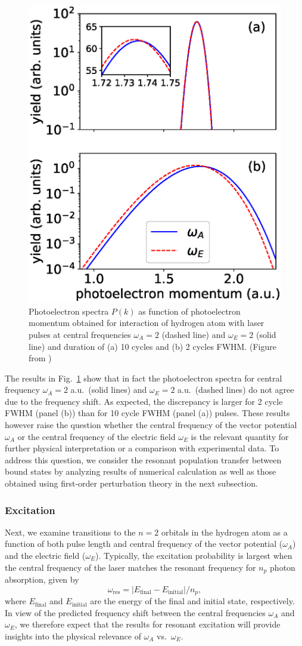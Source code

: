 \begin{figure}[!ht]
\centering
    \includegraphics[width=0.4\linewidth]{figs/Frequency_shift/single_photon_ion.eps}
\caption{
Photoelectron spectra $P(k)$ as function of photoelectron momentum obtained for interaction of hydrogen atom with laser pulses at central frequencies $\omega_A=2$ (dashed line) and $\omega_E=2$ (solid line) and duration of (a) 10 cycles and (b) 2 cycles FWHM. (Figure from \cite{venzke2018_Central})
}
  \label{fig:ionizationA}
\end{figure}

The results in Fig.~\ref{fig:ionizationA} show that in fact the photoelectron spectra for central frequency $\omega_A = 2$ a.u.\  (solid lines) and $\omega_E = 2$ a.u.\  (dashed lines) do not agree due to the frequency shift. As expected, the discrepancy is larger for 2 cycle FWHM (panel (b)) than for 10 cycle FWHM (panel (a)) pulses. These results however raise the question whether the central frequency of the vector potential $\omega_A$ or the central frequency of the electric field $\omega_E$ is the relevant quantity for further physical interpretation or a comparison with experimental data. To address this question, we consider the resonant population transfer between bound states by analyzing results of numerical calculation as well as those obtained using first-order perturbation theory in the next subsection.

\subsubsection{Excitation}
\label{sec:excitation}

Next, we examine transitions to the $n=2$ orbitals in the hydrogen atom as a function of both pulse length and central frequency of the vector potential ($\omega_A$) and the electric field ($\omega_E$).
Typically, the excitation probability is largest when the central frequency of the laser matches the resonant frequency for $n_p$ photon absorption, given by
\begin{equation}
\omega_{\text{res}} = |E_\text{final} - E_\text{initial}|/n_p,
\end{equation}
where $E_\text{final}$ and $E_\text{initial}$ are the energy of the final and initial state, respectively. In view of the predicted frequency shift between the central frequencies $\omega_A$ and $\omega_E$, we therefore expect that the results for resonant excitation will provide insights into the physical relevance of $\omega_A$ vs.~$\omega_E$.

